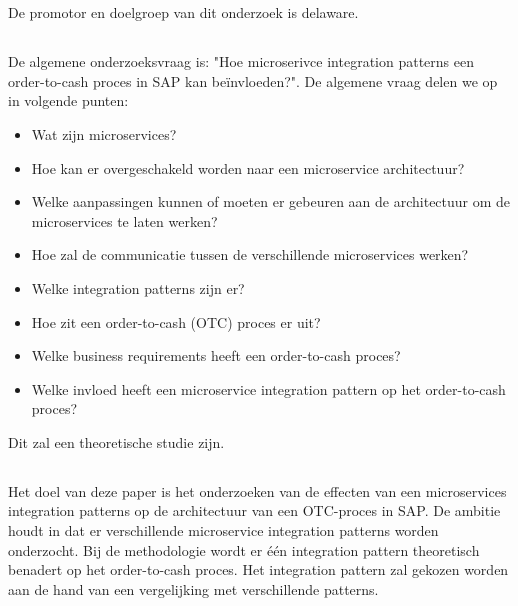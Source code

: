 
\chapter{}
\label{ch:inleiding}

\section{}
\label{sec:probleemstelling}
De promotor en doelgroep van dit onderzoek is delaware.

\section{}
\label{sec:onderzoeksvraag}
De algemene onderzoeksvraag is: "Hoe microserivce integration patterns een order-to-cash proces in SAP kan beïnvloeden?". De algemene vraag delen we op in volgende punten:
\begin{itemize}
  \item Wat zijn microservices?
  \item Hoe kan er overgeschakeld worden naar een microservice architectuur?
  \item Welke aanpassingen kunnen of moeten er gebeuren aan de architectuur om de microservices te laten werken?
  \item Hoe zal de communicatie tussen de verschillende microservices werken?
  \item Welke integration patterns zijn er?
  \item Hoe zit een order-to-cash (OTC) proces er uit?
  \item Welke business requirements heeft een order-to-cash proces?
  \item Welke invloed heeft een microservice integration pattern op het order-to-cash proces?
\end{itemize}
Dit zal een theoretische studie zijn.

\section{}
\label{sec:onderzoeksdoelstelling}
Het doel van deze paper is het onderzoeken van de effecten van een microservices integration patterns op de architectuur van een OTC-proces in SAP. De ambitie houdt in dat er verschillende microservice integration patterns worden onderzocht. Bij de methodologie wordt er één integration pattern theoretisch benadert op het order-to-cash proces. Het integration pattern zal gekozen worden aan de hand van een vergelijking met verschillende patterns.

